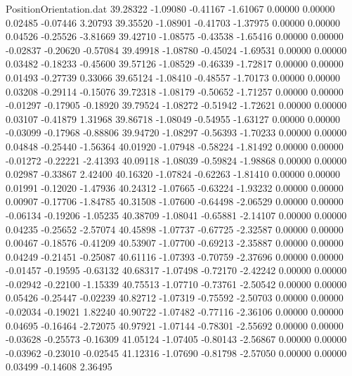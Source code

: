 \begin{filecontents}{PositionOrientation.dat}
  39.28322   -1.09080   -0.41167    -1.61067    0.00000    0.00000    0.02485   -0.07446    3.20793
  39.35520   -1.08901   -0.41703    -1.37975    0.00000    0.00000    0.04526   -0.25526   -3.81669
  39.42710   -1.08575   -0.43538    -1.65416    0.00000    0.00000   -0.02837   -0.20620   -0.57084
  39.49918   -1.08780   -0.45024    -1.69531    0.00000    0.00000    0.03482   -0.18233   -0.45600
  39.57126   -1.08529   -0.46339    -1.72817    0.00000    0.00000    0.01493   -0.27739    0.33066
  39.65124   -1.08410   -0.48557    -1.70173    0.00000    0.00000    0.03208   -0.29114   -0.15076
  39.72318   -1.08179   -0.50652    -1.71257    0.00000    0.00000   -0.01297   -0.17905   -0.18920
  39.79524   -1.08272   -0.51942    -1.72621    0.00000    0.00000    0.03107   -0.41879    1.31968
  39.86718   -1.08049   -0.54955    -1.63127    0.00000    0.00000   -0.03099   -0.17968   -0.88806
  39.94720   -1.08297   -0.56393    -1.70233    0.00000    0.00000    0.04848   -0.25440   -1.56364
  40.01920   -1.07948   -0.58224    -1.81492    0.00000    0.00000   -0.01272   -0.22221   -2.41393
  40.09118   -1.08039   -0.59824    -1.98868    0.00000    0.00000    0.02987   -0.33867    2.42400
  40.16320   -1.07824   -0.62263    -1.81410    0.00000    0.00000    0.01991   -0.12020   -1.47936
  40.24312   -1.07665   -0.63224    -1.93232    0.00000    0.00000    0.00907   -0.17706   -1.84785
  40.31508   -1.07600   -0.64498    -2.06529    0.00000    0.00000   -0.06134   -0.19206   -1.05235
  40.38709   -1.08041   -0.65881    -2.14107    0.00000    0.00000    0.04235   -0.25652   -2.57074
  40.45898   -1.07737   -0.67725    -2.32587    0.00000    0.00000    0.00467   -0.18576   -0.41209
  40.53907   -1.07700   -0.69213    -2.35887    0.00000    0.00000    0.04249   -0.21451   -0.25087
  40.61116   -1.07393   -0.70759    -2.37696    0.00000    0.00000   -0.01457   -0.19595   -0.63132
  40.68317   -1.07498   -0.72170    -2.42242    0.00000    0.00000   -0.02942   -0.22100   -1.15339
  40.75513   -1.07710   -0.73761    -2.50542    0.00000    0.00000    0.05426   -0.25447   -0.02239
  40.82712   -1.07319   -0.75592    -2.50703    0.00000    0.00000   -0.02034   -0.19021    1.82240
  40.90722   -1.07482   -0.77116    -2.36106    0.00000    0.00000    0.04695   -0.16464   -2.72075
  40.97921   -1.07144   -0.78301    -2.55692    0.00000    0.00000   -0.03628   -0.25573   -0.16309
  41.05124   -1.07405   -0.80143    -2.56867    0.00000    0.00000   -0.03962   -0.23010   -0.02545
  41.12316   -1.07690   -0.81798    -2.57050    0.00000    0.00000    0.03499   -0.14608    2.36495

\end{filecontents}
